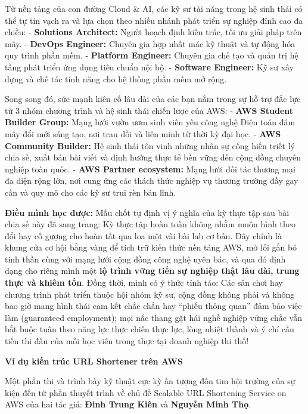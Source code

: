 Từ nền tảng của con đường Cloud \& AI, các kỹ sư tài năng trong hệ sinh
thái có thể tự tin vạch ra và lựa chọn theo nhiều nhánh phát triển sự
nghiệp đỉnh cao đa chiều: - \textbf{Solutions Architect:} Người hoạch
định kiến trúc, tối ưu giải pháp trên mây. - \textbf{DevOps Engineer:}
Chuyên gia hợp nhất mác kỹ thuật và tự động hóa quy trình phần mềm. -
\textbf{Platform Engineer:} Chuyên gia chế tạo và quản trị hệ tầng phát
triển ứng dụng tiêu chuẩn nội bộ. - \textbf{Software Engineer:} Kỹ sư
xây dựng và chế tác tính năng cho hệ thống phần mềm mở rộng.

Song song đó, sức mạnh kiên cố lâu dài của các bạn nằm trong sự hỗ trợ
đắc lực từ 3 nhóm chương trình và hệ sinh thái chiến lược của AWS: -
\textbf{AWS Student Builder Group:} Mạng lưới vườn ươm sinh viên yêu
công nghệ Điện toán đám mây đổi mới sáng tạo, nơi trau dồi và liên minh
từ thời kỳ đại học. - \textbf{AWS Community Builder:} Hệ sinh thái tôn
vinh những nhân sự cống hiến triết lý chia sẻ, xuất bản bài viết và định
hướng thực tế bền vững đến cộng đồng chuyên nghiệp toàn quốc. -
\textbf{AWS Partner ecosystem:} Mạng lưới đối tác thương mại đa diện
rộng lớn, nơi cung ứng các thách thức nghiệp vụ thương trường đầy gay
cấn và quy mô cho các kỹ sư trui rèn bản lĩnh.

\textbf{Điều mình học được:} Mấu chốt tự định vị ý nghĩa của kỳ thực tập
sau bài chia sẻ này đã sang trang: Kỳ thực tập hoàn toàn không nhằm muôn
hình theo đổi hay cố gượng cho hoàn tất qua loa một vài bài lab cơ bản.
Đây chính là khung cửa cơ hội bằng vàng để tích trữ kiến thức nền tảng
AWS, mở lối gắn bó tinh thần cùng với mạng lưới cộng đồng công nghệ uyên
bác, và qua đó định dạng cho riêng mình một \textbf{lộ trình vững tiến
sự nghiệp thật lâu dài, trung thực và khiêm tốn}. Đồng thời, mình có ý
thức tỉnh táo: Các sân chơi hay chương trình phát triển thuộc hội nhóm
kỹ sư, cộng đồng không phải và không bao giờ mang hình thái cam kết chắc
chắn hay ``phiếu thông quan'' đảm bảo việc làm (guaranteed employment);
mọi nấc thang gặt hái nghề nghiệp vững chắc vẫn bắt buộc tuân theo năng
lực thực chiến thực lực, lòng nhiệt thành và ý chí cầu tiến thi đấu của
mỗi học viên trong thực tại doanh nghiệp thi thố!

\vspace{0.5em}\noindent\textbf{Ví dụ kiến trúc URL Shortener trên
AWS}\par

Một phần thi và trình bày kỹ thuật cực kỳ ấn tượng đốn tim hội trường
của sự kiện đến từ phần thuyết trình về chủ đề Scalable URL Shortening
Service on AWS của hai tác giả: \textbf{Đinh Trung Kiên} và
\textbf{Nguyễn Minh Thọ}.

